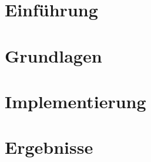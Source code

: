 \documentclass{scrreprt}
\begin{document}
\chapter{Einführung}




\chapter{Grundlagen}














\chapter{Implementierung}





\chapter{Ergebnisse}







\end{document}
